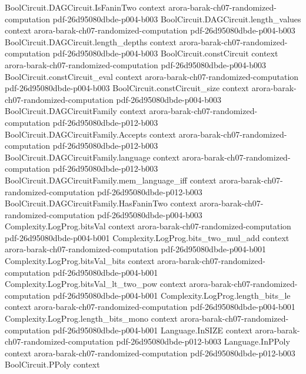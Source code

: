 \begin{theorem}
\proofstep
  {BoolCircuit.DAGCircuit.IsFaninTwo}
  {context}
  {arora-barak-ch07-randomized-computation}
  {pdf-26d95080dbde-p004-b003}
\proofstep
  {BoolCircuit.DAGCircuit.length_values}
  {context}
  {arora-barak-ch07-randomized-computation}
  {pdf-26d95080dbde-p004-b003}
\proofstep
  {BoolCircuit.DAGCircuit.length_depths}
  {context}
  {arora-barak-ch07-randomized-computation}
  {pdf-26d95080dbde-p004-b003}
\proofstep
  {BoolCircuit.constCircuit}
  {context}
  {arora-barak-ch07-randomized-computation}
  {pdf-26d95080dbde-p004-b003}
\proofstep
  {BoolCircuit.constCircuit_eval}
  {context}
  {arora-barak-ch07-randomized-computation}
  {pdf-26d95080dbde-p004-b003}
\proofstep
  {BoolCircuit.constCircuit_size}
  {context}
  {arora-barak-ch07-randomized-computation}
  {pdf-26d95080dbde-p004-b003}
\proofstep
  {BoolCircuit.DAGCircuitFamily}
  {context}
  {arora-barak-ch07-randomized-computation}
  {pdf-26d95080dbde-p012-b003}
\proofstep
  {BoolCircuit.DAGCircuitFamily.Accepts}
  {context}
  {arora-barak-ch07-randomized-computation}
  {pdf-26d95080dbde-p012-b003}
\proofstep
  {BoolCircuit.DAGCircuitFamily.language}
  {context}
  {arora-barak-ch07-randomized-computation}
  {pdf-26d95080dbde-p012-b003}
\proofstep
  {BoolCircuit.DAGCircuitFamily.mem_language_iff}
  {context}
  {arora-barak-ch07-randomized-computation}
  {pdf-26d95080dbde-p012-b003}
\proofstep
  {BoolCircuit.DAGCircuitFamily.HasFaninTwo}
  {context}
  {arora-barak-ch07-randomized-computation}
  {pdf-26d95080dbde-p004-b003}
\proofstep
  {Complexity.LogProg.bitsVal}
  {context}
  {arora-barak-ch07-randomized-computation}
  {pdf-26d95080dbde-p004-b001}
\proofstep
  {Complexity.LogProg.bits_two_mul_add}
  {context}
  {arora-barak-ch07-randomized-computation}
  {pdf-26d95080dbde-p004-b001}
\proofstep
  {Complexity.LogProg.bitsVal_bits}
  {context}
  {arora-barak-ch07-randomized-computation}
  {pdf-26d95080dbde-p004-b001}
\proofstep
  {Complexity.LogProg.bitsVal_lt_two_pow}
  {context}
  {arora-barak-ch07-randomized-computation}
  {pdf-26d95080dbde-p004-b001}
\proofstep
  {Complexity.LogProg.length_bits_le}
  {context}
  {arora-barak-ch07-randomized-computation}
  {pdf-26d95080dbde-p004-b001}
\proofstep
  {Complexity.LogProg.length_bits_mono}
  {context}
  {arora-barak-ch07-randomized-computation}
  {pdf-26d95080dbde-p004-b001}
\proofstep
  {Language.InSIZE}
  {context}
  {arora-barak-ch07-randomized-computation}
  {pdf-26d95080dbde-p012-b003}
\proofstep
  {Language.InPPoly}
  {context}
  {arora-barak-ch07-randomized-computation}
  {pdf-26d95080dbde-p012-b003}
\proofstep
  {BoolCircuit.PPoly}
  {context}

\end{theorem}
